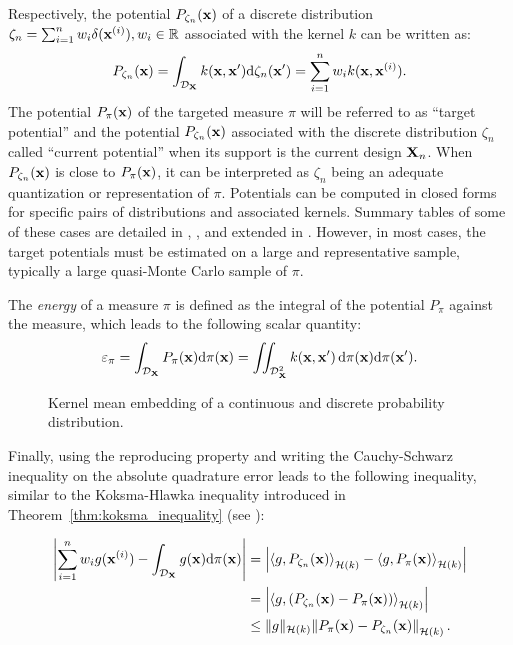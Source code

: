 Respectively, the potential $P_{\zeta_n}({\bf x})$ of a discrete distribution $\zeta_n = \sum_{i=1}^{n} w_i \delta({\bf x}^{(i)}), w_i \in \mathbb{R}$ associated with the kernel $k$ can be written as:
\begin{equation}\label{eq:potential}
    P_{\zeta_n}({\bf x}) =  \int_{\mathcal{D}_{{\bf X}}} k({\bf x}, {\bf x}') \mathrm{d} \zeta_n({\bf x}') = \sum_{i=1}^{n} w_i k({\bf x}, {\bf x}^{(i)}).
\end{equation}
The potential $P_{\pi}({\bf x})$ of the targeted measure $\pi$ will be referred to as ``target potential'' and the potential $P_{\zeta_n}({\bf x})$ associated with the discrete distribution $\zeta_n$ called ``current potential'' when its support is the current design ${\bf X}_n$. 
When $P_{\zeta_n}({\bf x})$ is close to $P_{\pi}({\bf x})$, it can be interpreted as $\zeta_n$ being an adequate quantization or representation of $\pi$. %
Potentials can be computed in closed forms for specific pairs of distributions and associated kernels. 
Summary tables of some of these cases are detailed in \cite[Sec. 3.4]{briol_phd_2019}, \cite[Sec. 4]{pronzato_zhigljavsky_2020}, and extended in \cite{fekhari_iooss_2023}. 
However, in most cases, the target potentials must be estimated on a large and representative sample, typically a large quasi-Monte Carlo sample of $\pi$.


The \emph{energy} of a measure $\pi$ is defined as the integral of the potential $P_\pi$ against the measure, which leads to the following scalar quantity:
\begin{equation}
    \varepsilon_\pi= \int_{\mathcal{D}_{{\bf X}}} P_{\pi}({\bf x}) \mathrm{d} \pi({\bf x}) = \iint_{\mathcal{D}_{{\bf X}}^2} k({\bf x}, {\bf x}')\, \mathrm{d}\pi({\bf x}) \mathrm{d}\pi({\bf x}').
    \label{eq:target_energy}
\end{equation}

\begin{figure}
    \centering
    
    \caption{Kernel mean embedding of a continuous and discrete probability distribution.}
    \label{fig:kernel_mean_embedding}
\end{figure}
Finally, using the reproducing property and writing the Cauchy-Schwarz inequality on the absolute quadrature error leads to the following inequality, similar to the Koksma-Hlawka inequality introduced in Theorem~\ref{thm:koksma_inequality} (see \citealp{briol_oates_2019}): 

\begin{subequations}
\begin{align}
    \left| \sum_{i=1}^{n} w_i g({\bf x}^{(i)}) - \int_{\mathcal{D}_{{\bf X}}} g({\bf x}) \mathrm{d} \pi({\bf x}) \right| &= \left| \left\langle g, P_{\zeta_n}({\bf x}) \right\rangle_{\mathcal{H}(k)} - \left\langle g, P_{\pi}({\bf x}) \right\rangle_{\mathcal{H}(k)} \right| \\
    &= \left| \left\langle g, \left(P_{\zeta_n}({\bf x}) - P_{\pi}({\bf x})\right) \right\rangle_{\mathcal{H}(k)} \right|\\
    &\leq \lVert g \lVert_{\mathcal{H}(k)}  \left\lVert P_{\pi}({\bf x}) - P_{\zeta_n}({\bf x}) \right\lVert_{\mathcal{H}(k)}.
    \label{eq:quad_error}
\end{align}
\end{subequations}

